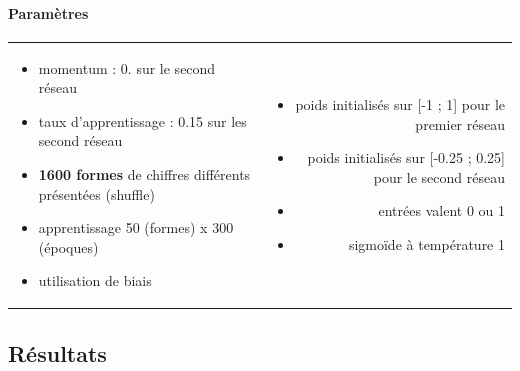     \paragraph{Paramètres}
      \begin{center}
	\begin{tabular}{lr}
	  \begin{minipage}{230px}
	    \begin{itemize}
	      \item momentum : 0. sur le second réseau
	      \item taux d'apprentissage : 0.15 sur les second réseau
	      \item \textbf{1600 formes} de chiffres différents présentées (shuffle) \cite{Handwritten_256}
	      \item apprentissage 50 (formes) x 300 (époques)
	      \item utilisation de biais
	      
	    \end{itemize}
	  \end{minipage}
	  &
	  \begin{minipage}{230px}
	    \begin{itemize}
	      \item poids initialisés sur [-1 ; 1] pour le premier réseau
	      \item poids initialisés sur [-0.25 ; 0.25] pour le second réseau
	      \item entrées valent 0 ou 1
	      \item sigmoïde à température 1
	    \end{itemize}
	  \end{minipage}
	\end{tabular}
      \end{center}

  
  \newpage
  \subsection{Résultats}
